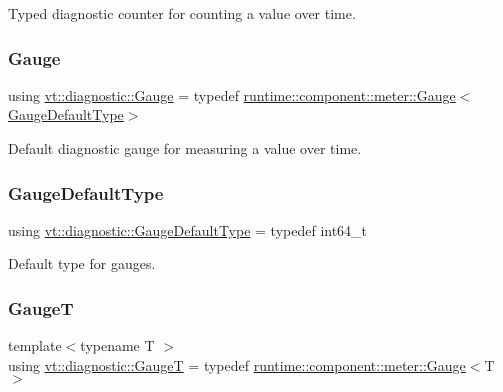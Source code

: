 Typed diagnostic counter for counting a value over time. 

\mbox{\label{namespacevt_1_1diagnostic_ad68069af499e2047c28d1852d77680ee}} 
\subsubsection{\texorpdfstring{Gauge}{Gauge}}
{\footnotesize\ttfamily using \hyperlink{namespacevt_1_1diagnostic_ad68069af499e2047c28d1852d77680ee}{vt\+::diagnostic\+::\+Gauge} = typedef \hyperlink{structvt_1_1runtime_1_1component_1_1meter_1_1_gauge}{runtime\+::component\+::meter\+::\+Gauge}$<$\hyperlink{namespacevt_1_1diagnostic_a32500a7e9e4ef4618d0084987ea40a8c}{Gauge\+Default\+Type}$>$}



Default diagnostic gauge for measuring a value over time. 

\mbox{\label{namespacevt_1_1diagnostic_a32500a7e9e4ef4618d0084987ea40a8c}} 
\subsubsection{\texorpdfstring{Gauge\+Default\+Type}{GaugeDefaultType}}
{\footnotesize\ttfamily using \hyperlink{namespacevt_1_1diagnostic_a32500a7e9e4ef4618d0084987ea40a8c}{vt\+::diagnostic\+::\+Gauge\+Default\+Type} = typedef int64\+\_\+t}



Default type for gauges. 

\mbox{\label{namespacevt_1_1diagnostic_ae6ef3ff71955fc319093c29ddf2700d1}} 
\subsubsection{\texorpdfstring{GaugeT}{GaugeT}}
{\footnotesize\ttfamily template$<$typename T $>$ \\
using \hyperlink{namespacevt_1_1diagnostic_ae6ef3ff71955fc319093c29ddf2700d1}{vt\+::diagnostic\+::\+GaugeT} = typedef \hyperlink{structvt_1_1runtime_1_1component_1_1meter_1_1_gauge}{runtime\+::component\+::meter\+::\+Gauge}$<$T$>$}



